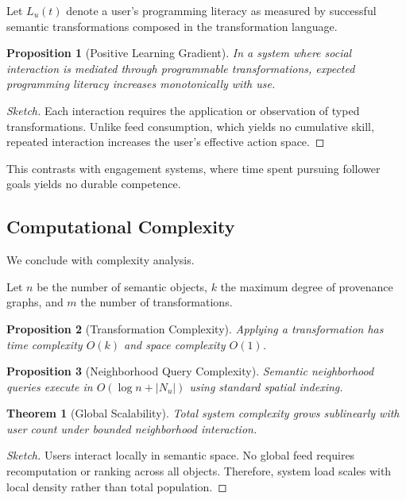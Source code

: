 \documentclass[11pt]{article}
\newtheorem{proposition}{Proposition}
\newtheorem{theorem}{Theorem}
\begin{document}
Let $L_u(t)$ denote a user’s programming literacy as measured by successful semantic
transformations composed in the transformation language.

\begin{proposition}[Positive Learning Gradient]
In a system where social interaction is mediated through programmable transformations,
expected programming literacy increases monotonically with use.
\end{proposition}

\begin{proof}[Sketch]
Each interaction requires the application or observation of typed transformations. Unlike
feed consumption, which yields no cumulative skill, repeated interaction increases the
user’s effective action space.
\end{proof}

This contrasts with engagement systems, where time spent pursuing follower goals yields no
durable competence.

\subsection{Computational Complexity}

We conclude with complexity analysis.

Let $n$ be the number of semantic objects, $k$ the maximum degree of provenance graphs,
and $m$ the number of transformations.

\begin{proposition}[Transformation Complexity]
Applying a transformation has time complexity $O(k)$ and space complexity $O(1)$.
\end{proposition}

\begin{proposition}[Neighborhood Query Complexity]
Semantic neighborhood queries execute in $O(\log n + |N_u|)$ using standard spatial
indexing.
\end{proposition}

\begin{theorem}[Global Scalability]
Total system complexity grows sublinearly with user count under bounded neighborhood
interaction.
\end{theorem}

\begin{proof}[Sketch]
Users interact locally in semantic space. No global feed requires recomputation or ranking
across all objects. Therefore, system load scales with local density rather than total
population.
\end{proof}
\end{document}
